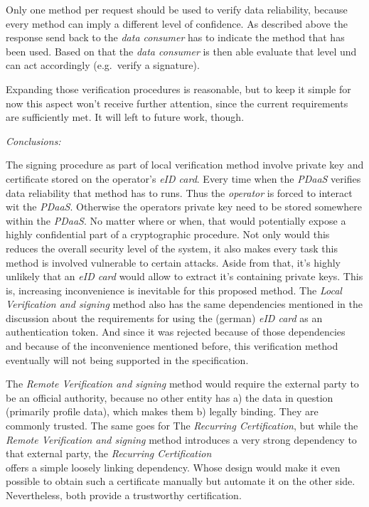 \documentclass[12pt,english,a4paper,titlepage,cleardoublepage=empty,dottedtoc]{report}
\begin{document}
Only one method per request should be used to verify data reliability,
because every method can imply a different level of confidence. As
described above the response send back to the \emph{data consumer} has
to indicate the method that has been used. Based on that the \emph{data
consumer} is then able evaluate that level und can act accordingly
(e.g.~verify a signature).

Expanding those verification procedures is reasonable, but to keep it
simple for now this aspect won't receive further attention, since the
current requirements are sufficiently met. It will left to future work,
though.

\emph{Conclusions:}

The signing procedure as part of local verification method involve
private key and certificate stored on the operator's \emph{eID card}.
Every time when the \emph{PDaaS} verifies data reliability that method
has to runs. Thus the \emph{operator} is forced to interact wit the
\emph{PDaaS}. Otherwise the operators private key need to be stored
somewhere within the \emph{PDaaS}. No matter where or when, that would
potentially expose a highly confidential part of a cryptographic
procedure. Not only would this reduces the overall security level of the
system, it also makes every task this method is involved vulnerable to
certain attacks. Aside from that, it's highly unlikely that an \emph{eID
card} would allow to extract it's containing private keys. This is,
increasing inconvenience is inevitable for this proposed method. The
\emph{Local Verification and signing} method also has the same
dependencies mentioned in the discussion about the requirements for
using the (german) \emph{eID card} as an authentication token. And since
it was rejected because of those dependencies and because of the
inconvenience mentioned before, this verification method eventually will
not being supported in the specification.

The \emph{Remote Verification and signing} method would require the
external party to be an official authority, because no other entity has
a) the data in question (primarily profile data), which makes them b)
legally binding. They are commonly trusted. The same goes for The
\emph{Recurring Certification}, but while the \emph{Remote Verification
and signing} method introduces a very strong dependency to that external
party, the \emph{Recurring Certification}\\
offers a simple loosely linking dependency. Whose design would make it
even possible to obtain such a certificate manually but automate it on
the other side. Nevertheless, both provide a trustworthy certification.
\end{document}
